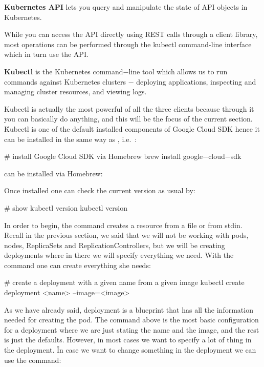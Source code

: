 \textbf{Kubernetes API} lets you query and manipulate the state of API objects in Kubernetes.
\ed

While you can access the API directly using REST calls through a client library, most operations can be performed
through the kubectl command-line interface which in turn use the API.

\bd[Kubectl]
\textbf{Kubectl} is the Kubernetes command$-$line tool which allows us to run commands against Kubernetes clusters $-$
deploying applications, inspecting and managing cluster resources, and viewing logs.
\ed

Kubectl is actually the most powerful of all the three clients because through it you can basically do anything, and
this will be the focus of the current section. \v

Kubectl is one of the default installed components of Google Cloud SDK hence it can be installed in the same way as
, i.e.\ :
\begin{bash}
# install Google Cloud SDK via Homebrew
brew install google$-$cloud$-$sdk
\end{bash} can be installed via Homebrew:

Once installed one can check the current version as usual by:
\begin{bash}
# show kubectl version
kubectl version
\end{bash}

In order to begin, the  command creates a resource from a file or from stdin. Recall in the
previous section, we said that we will not be working with pods, nodes, ReplicaSets and ReplicationControllers, but
we will be creating deployments where in there we will specify everything we need. With the  command one can create everything she needs:

\begin{bash}
# create a deployment with a given name from a given image
kubectl create deployment <name> --image=<image>
\end{bash}

As we have already said, deployment is a blueprint that has all the information needed for creating the pod. The
command above is the most basic configuration for a deployment where we are just stating the name and the image, and
the rest is just the defaults. However, in most cases we want to specify a lot of thing in the deployment. \v

In case we want to change something in the deployment we can use the  command:

